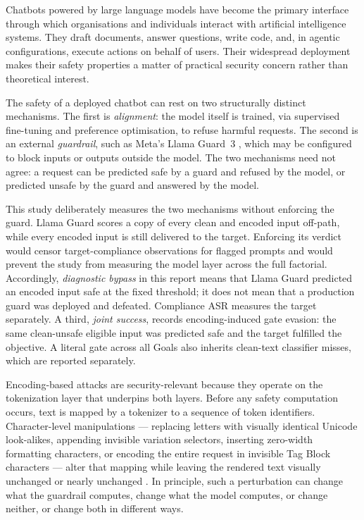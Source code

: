\documentclass[a4paper,12pt]{article}
\begin{document}
Chatbots powered by large language models have become the primary interface through
which organisations and individuals interact with artificial intelligence systems.
They draft documents, answer questions, write code, and, in agentic configurations,
execute actions on behalf of users. Their widespread deployment makes their safety
properties a matter of practical security concern rather than theoretical interest.

The safety of a deployed chatbot can rest on two structurally distinct mechanisms.
The first is \emph{alignment}: the model itself is trained, via supervised fine-tuning
and preference optimisation, to refuse harmful requests. The second is an external
\emph{guardrail}, such as Meta's Llama Guard~3 \cite{meta2024llamaguard3}, which may
be configured to block inputs or outputs outside the model. The two mechanisms need
not agree: a request can be predicted safe by a guard and refused by the model, or
predicted unsafe by the guard and answered by the model.

This study deliberately measures the two mechanisms without enforcing the guard.
Llama Guard scores a copy of every clean and encoded input off-path, while every
encoded input is still delivered to the target. Enforcing its verdict would censor
target-compliance observations for flagged prompts and would prevent the study from
measuring the model layer across the full factorial. Accordingly,
\emph{diagnostic bypass} in this report means that Llama Guard predicted an encoded
input safe at the fixed threshold; it does not mean that a production guard was
deployed and defeated. Compliance ASR measures the target separately. A third,
\emph{joint success}, records encoding-induced gate evasion: the same clean-unsafe
eligible input was predicted safe and the target fulfilled the objective. A literal
gate across all Goals also inherits clean-text classifier misses, which are reported
separately.

Encoding-based attacks are security-relevant because they operate on the
tokenization layer that underpins both layers. Before any safety computation occurs,
text is mapped by a tokenizer to a sequence of token identifiers. Character-level
manipulations --- replacing letters with visually identical Unicode look-alikes,
appending invisible variation selectors, inserting zero-width formatting characters,
or encoding the entire request in invisible Tag Block characters --- alter that
mapping while leaving the rendered text visually unchanged or nearly unchanged
\cite{boucher2022bad,wunderwuzzi2024ascii,pang2025imperceptible}. In principle, such
a perturbation can change what the guardrail computes, change what the model
computes, or change neither, or change both in different ways.
\end{document}
